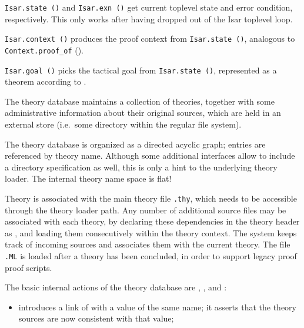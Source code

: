 \begin{isabellebody}
\begin{isamarkuptext}
\begin{description}
  \item \verb|Isar.state ()| and \verb|Isar.exn ()| get current
  toplevel state and error condition, respectively.  This only works
  after having dropped out of the Isar toplevel loop.

  \item \verb|Isar.context ()| produces the proof context from \verb|Isar.state ()|, analogous to \verb|Context.proof_of|
  ().

  \item \verb|Isar.goal ()| picks the tactical goal from \verb|Isar.state ()|, represented as a theorem according to
  .

  \end{description}%
\end{isamarkuptext}%
\isamarkuptrue%
%
\endisatagmlref
{\isafoldmlref}%
%
\isadelimmlref
%
\endisadelimmlref
%
\isamarkuptrue%
%
\begin{isamarkuptext}%
The theory database maintains a collection of theories, together
  with some administrative information about their original sources,
  which are held in an external store (i.e.\ some directory within the
  regular file system).

  The theory database is organized as a directed acyclic graph;
  entries are referenced by theory name.  Although some additional
  interfaces allow to include a directory specification as well, this
  is only a hint to the underlying theory loader.  The internal theory
  name space is flat!

  Theory  is associated with the main theory file \verb,.thy,, which needs to be accessible through the theory
  loader path.  Any number of additional {\ML} source files may be
  associated with each theory, by declaring these dependencies in the
  theory header as \isa{{\isasymUSES}}, and loading them consecutively
  within the theory context.  The system keeps track of incoming {\ML}
  sources and associates them with the current theory.  The file
  \verb,.ML, is loaded after a theory has been concluded, in
  order to support legacy proof {\ML} proof scripts.

  The basic internal actions of the theory database are , , and :

  \begin{itemize}

  \item {} introduces a link of  with a
   value of the same name; it asserts that the theory
  sources are now consistent with that value;


\end{itemize}
\end{isamarkuptext}
\end{isabellebody}
